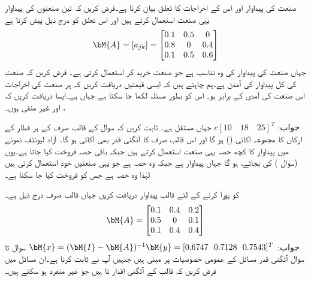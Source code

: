  صنعت کی پیداوار اور اس کے اخراجات کا تعلق بیان کرتا ہے۔فرض کریں کہ تین صنعتوں کی پیداوار یہی صنعت استعمال کرتے ہیں اور اس تعلق کو درج ذیل    پیش کرتا ہے
\begin{align*}
\bM{A}=[a_{jk}]=\begin{bmatrix} 0.1&0.5&0\\0.8&0&0.4\\0.1&0.5&0.6 \end{bmatrix}
\end{align*}
جہاں  صنعت  کی پیداوار کی وہ تناسب  ہے جو صنعت  خرید کر استعمال کرتی ہے۔ فرض کریں کہ صنعت  کی کل پیداوار کی آمدن   ہے۔ہم چاہتے ہیں کہ ایسی قیمتیں دریافت کریں کہ ہر صنعت کی اخراجات اس صنعت کی آمدی کے برابر ہو۔ اس کو بطور مسئلہ  لکھا جا سکتا ہے جہاں  ہے۔ایسا  دریافت کریں کہ ،  اور  غیر منفی ہوں۔

جواب:
$c[10\quad 18\quad 25]^T$
جہاں  مستقل ہے۔
ثابت کریں کہ سوال  کے قالب صرف  کے ہر قطار کے ارکان کا مجموعہ اکائی () ہو گا اور اس قالب صرف کا آئگنی قدر بھی اکائی ہو گا۔
آزاد لیونٹف نمونے میں پیداوار کا کچھ حصہ یہی صنعت استعمال کرتے ہیں جبکہ باقی حصہ فروخت کیا جاتا ہے۔یوں  (سوال ) کی بجائے،    ہو گا جہاں  پیداوار ہے جبکہ  وہ حصہ ہے جو یہی صنعتیں خود استعمال کرتی ہیں لہٰذا  وہ حصہ ہے جس کو فروخت کیا جا سکتا ہے۔

  کو پورا کرنے کے لئے قالب پیداوار  دریافت کریں جہاں قالب صرف درج ذیل ہے۔
\begin{align*}
\bM{A}=\begin{bmatrix} 0.1&0.4&0.2\\0.5&0&0.1\\0.1&0.4&0.4 \end{bmatrix}
\end{align*}
جواب:
$\bM{x}=(\bM{I}-\bM{A})^{-1}\bM{y}=[0.6747\,\,\,\,0.7128\,\,\,\,0.7543]^T$
سوال  تا سوال  آئگنی قدر مسائل کے عمومی خصوصیات پر مبنی ہیں جنہیں آپ نے ثابت کرنا ہے۔ان مسائل میں فرض کریں کہ  قالب  کے آئگنی اقدار  تا   ہیں جو غیر منفرد ہو سکتے ہیں۔

